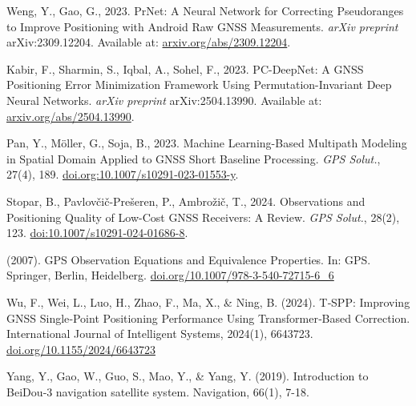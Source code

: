 \documentclass{isprs} %
\begin{document}
\begin{thebibliography}{}
\label{weng2023} 
Weng, Y., Gao, G., 2023. PrNet: A Neural Network for Correcting Pseudoranges to Improve Positioning with Android Raw GNSS Measurements. 
\textit{arXiv preprint} arXiv:2309.12204. 
Available at: \href{https://arxiv.org/abs/2309.12204}{arxiv.org/abs/2309.12204}.

\label{kabir2023} 
Kabir, F., Sharmin, S., Iqbal, A., Sohel, F., 2023. PC-DeepNet: A GNSS Positioning Error Minimization Framework Using Permutation-Invariant Deep Neural Networks. 
\textit{arXiv preprint} arXiv:2504.13990. 
Available at: \href{https://arxiv.org/abs/2504.13990}{arxiv.org/abs/2504.13990}.

\label{pan2023} 
Pan, Y., Möller, G., Soja, B., 2023. Machine Learning-Based Multipath Modeling in Spatial Domain Applied to GNSS Short Baseline Processing. 
\textit{GPS Solut.}, 27(4), 189. 
\href{https://doi.org/10.1007/s10291-023-01553-y}{doi.org:10.1007/s10291-023-01553-y}.

\label{stopar2024} 
Stopar, B., Pavlovčič-Prešeren, P., Ambrožič, T., 2024. Observations and Positioning Quality of Low-Cost GNSS Receivers: A Review. 
\textit{GPS Solut.}, 28(2), 123. 
\href{https://doi.org/10.1007/s10291-024-01686-8}{doi:10.1007/s10291-024-01686-8}.

\label{TeunissenMontenbruck} 
(2007). GPS Observation Equations and Equivalence Properties. In: GPS. Springer, Berlin, Heidelberg. \href{https://doi.org/10.1007/978-3-540-72715-6_6}{doi.org/10.1007/978-3-540-72715-6\_6}

\label{Wu2024}
Wu, F., Wei, L., Luo, H., Zhao, F., Ma, X., \& Ning, B. (2024). T‐SPP: Improving GNSS Single‐Point Positioning Performance Using Transformer‐Based Correction. International Journal of Intelligent Systems, 2024(1), 6643723. \href{https://doi.org/10.1155/2024/6643723}{doi.org/10.1155/2024/6643723}

\label{Yang2019} 
Yang, Y., Gao, W., Guo, S., Mao, Y., \& Yang, Y. (2019). Introduction to BeiDou‐3 navigation satellite system. Navigation, 66(1), 7-18.

\end{thebibliography}
\end{document}
